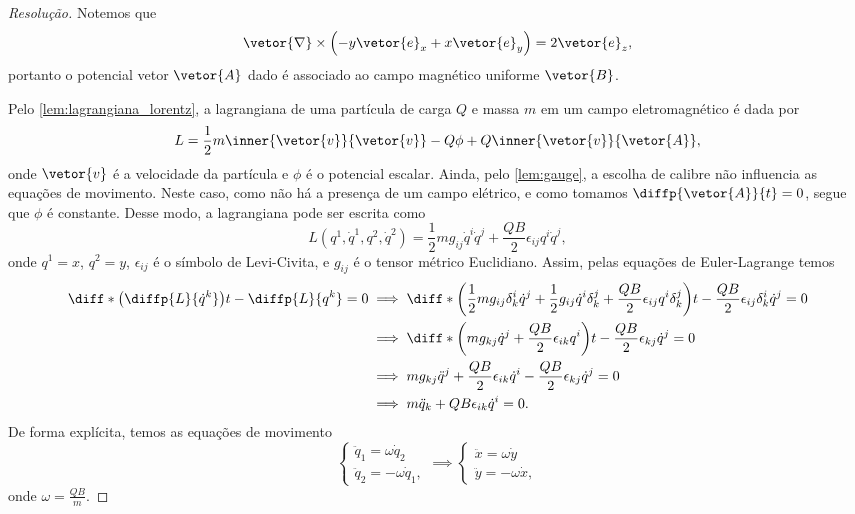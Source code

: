 \begin{proof}[Resolução]
    Notemos que
    \begin{equation*}
        \vetor{\nabla} \times \left(- y\vetor{e}_x + x\vetor{e}_y\right) = 2 \vetor{e}_z,
    \end{equation*}
    portanto o potencial vetor \(\vetor{A}\) dado é associado ao campo magnético uniforme \(\vetor{B}\).

    Pelo \cref{lem:lagrangiana_lorentz}, a lagrangiana de uma partícula de carga \(Q\) e massa \(m\) em um campo eletromagnético é dada por
    \begin{equation*}
    L = \frac12 m\inner{\vetor{v}}{\vetor{v}} - Q\phi + Q \inner{\vetor{v}}{\vetor{A}},
    \end{equation*}
    onde \(\vetor{v}\) é a velocidade da partícula e \(\phi\) é o potencial escalar. Ainda, pelo \cref{lem:gauge}, a escolha de calibre não influencia as equações de movimento. Neste caso, como não há a presença de um campo elétrico, e como tomamos \(\diffp{\vetor{A}}{t} = 0\), segue que \(\phi\) é constante. Desse modo, a lagrangiana pode ser escrita como
    \begin{equation*}
        L(q^1,\dot{q}^1, q^2, \dot{q}^2) = \frac12 m g_{ij}\dot{q}^i \dot{q}^j + \frac{QB}{2} \epsilon_{ij}q^i\dot{q}^j,
    \end{equation*}
    onde \(q^1 = x\), \(q^2 = y\), \(\epsilon_{ij}\) é o símbolo de Levi-Civita, e \(g_{ij}\) é o tensor métrico Euclidiano. Assim, pelas equações de Euler-Lagrange temos
    \begin{align*}
        \diff*{\left(\diffp{L}{\dot{q}^k}\right)}{t} - \diffp{L}{q^k} = 0 &\implies \diff*{\left(\frac12 mg_{ij} \delta^i_k \dot{q}^j + \frac12 g_{ij} \dot{q}^i\delta^j_k + \frac{QB}{2}\epsilon_{ij} q^i \delta^j_k\right)}{t} - \frac{QB}{2} \epsilon_{ij}\delta^i_k \dot{q}^j = 0\\
                                                                          &\implies \diff*{\left(mg_{kj} \dot{q}^j + \frac{QB}{2}\epsilon_{ik} q^i \right)}{t} - \frac{QB}{2} \epsilon_{kj}\dot{q}^j = 0\\
                                                                          &\implies mg_{kj} \ddot{q}^j + \frac{QB}{2}\epsilon_{ik} \dot{q}^i - \frac{QB}{2} \epsilon_{kj}\dot{q}^j = 0\\
                                                                          &\implies m\ddot{q}_k + QB\epsilon_{ik} \dot{q}^i = 0.
    \end{align*}
    De forma explícita, temos as equações de movimento
    \begin{equation*}
        \begin{cases}
            \ddot{q}_1 = \omega\dot{q}_2\\
            \ddot{q}_2 = -\omega\dot{q}_1,
        \end{cases} \implies
        \begin{cases}
            \ddot{x} = \omega\dot{y}\\
            \ddot{y} = -\omega\dot{x},
        \end{cases}
    \end{equation*}
    onde \(\omega = \frac{QB}{m}\).


\end{proof}
